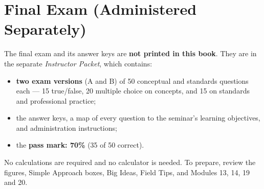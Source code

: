 \chapter{Final Exam (Administered Separately)}
The final exam and its answer keys are \textbf{not printed in this book}. They are in the separate \emph{Instructor Packet}, which contains:
\begin{itemize}
\item \textbf{two exam versions} (A and B) of 50 conceptual and standards questions each --- 15 true/false, 20 multiple choice on concepts, and 15 on standards and professional practice;
\item the answer keys, a map of every question to the seminar's learning objectives, and administration instructions;
\item the \textbf{pass mark: 70\%} (35 of 50 correct).
\end{itemize}
No calculations are required and no calculator is needed. To prepare, review the figures, Simple Approach boxes, Big Ideas, Field Tips, and Modules 13, 14, 19 and 20.

